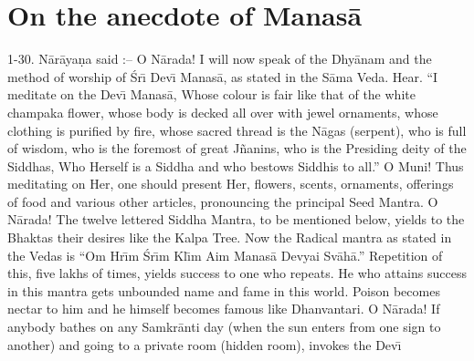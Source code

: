 \chapter{On the anecdote of Manas\=a}

1-30. N\=ar\=aya\d{n}a said :-- O N\=arada! I will now speak of the Dhy\=anam and the method of worship of \'Sr\={\i} Dev\={\i} Manas\=a, as stated in the S\=ama Veda. Hear. ``I meditate on the Dev\={\i} Manas\=a, Whose colour is fair like that of the white champaka flower, whose body is decked all over with jewel ornaments, whose clothing is purified by fire, whose sacred thread is the N\=agas (serpent), who is full of wisdom, who is the foremost of great J\~nanins, who is the Presiding deity of the Siddhas, Who Herself is a Siddha and who bestows Siddhis to all.'' O Muni! Thus meditating on Her, one should present Her, flowers, scents, ornaments, offerings of food and various other articles, pronouncing the principal Seed Mantra. O N\=arada! The twelve lettered Siddha Mantra, to be mentioned below, yields to the Bhaktas their desires like the Kalpa Tree. Now the Radical mantra as stated in the Vedas is ``Om Hr\={\i}m \'Sr\={\i}m Kl\={\i}m Aim Manas\=a Devyai Sv\=ah\=a.'' Repetition of this, five lakhs of times, yields success to one who repeats. He who attains success in this mantra gets unbounded name and fame in this world. Poison becomes nectar to him and he himself becomes famous like Dhanvantari. O N\=arada! If anybody bathes on any Samkr\=anti day (when the sun enters from one sign to another) and going to a private room (hidden room), invokes the Dev\={\i}


